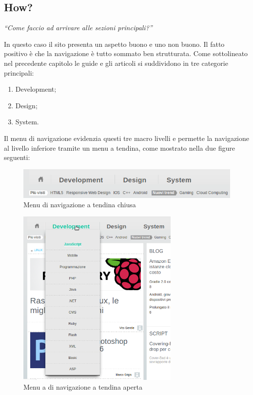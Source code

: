 \subsection{How?}

\begin{center}

\textit{``Come faccio ad arrivare alle sezioni principali?''}

\end{center}

In questo caso il sito presenta un aspetto buono e uno non buono. Il fatto positivo è che la navigazione è tutto sommato ben strutturata. Come sottolineato nel precedente capitolo le guide e gli articoli si suddividono in tre categorie principali:

\begin{enumerate}

\item Development;
\item Design;
\item System.

\end{enumerate}

Il menu di navigazione evidenzia questi tre macro livelli e permette la navigazione al livello inferiore tramite un menu a tendina, come mostrato nella due figure seguenti:

\begin{figure}[H]
\centering
\includegraphics[width=120mm]{images/menu.png}
\caption{Menu di navigazione a tendina chiusa}
\end{figure}

\begin{figure}[H]
\centering
\includegraphics[width=80mm]{images/menu1.png}
\caption{Menu a di navigazione a tendina aperta}
\end{figure}

